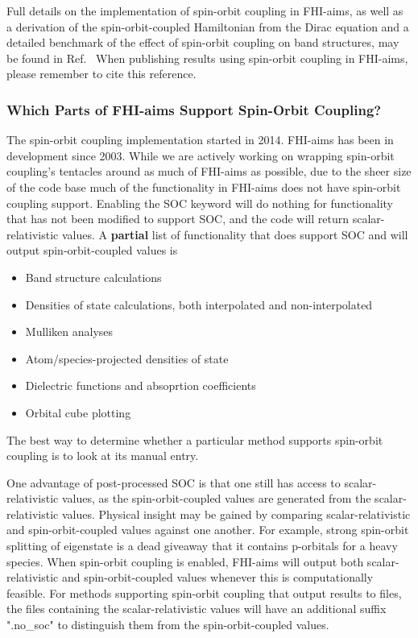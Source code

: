Full details on the implementation of spin-orbit coupling in FHI-aims, 
as well as a derivation of the spin-orbit-coupled Hamiltonian from the
Dirac equation and a detailed benchmark of the effect of spin-orbit 
coupling on band structures, may be found in Ref.~\cite{Huhn2017_SOC}  
When publishing results using spin-orbit coupling in FHI-aims, please 
remember to cite this reference.

\subsubsection{Which Parts of FHI-aims Support Spin-Orbit Coupling?}

The spin-orbit coupling implementation started in 2014.  FHI-aims has been 
in development since 2003.  While we are actively working on wrapping
spin-orbit coupling's tentacles around as much of FHI-aims as possible,
due to the sheer size of the code base much of the functionality in
FHI-aims does not have spin-orbit coupling support.  Enabling 
the SOC keyword will do nothing for functionality that has not been
modified to support SOC, and the code will return scalar-relativistic 
values.  A \textbf{partial} list of functionality that does support SOC 
and will output spin-orbit-coupled values is
\begin{itemize}
\item Band structure calculations
\item Densities of state calculations, both interpolated and 
	non-interpolated
\item Mulliken analyses
\item Atom/species-projected densities of state
\item Dielectric functions and absoprtion coefficients
\item Orbital cube plotting
\end{itemize}
The best way to determine whether a particular method supports
spin-orbit coupling is to look at its manual entry.

One advantage of post-processed SOC is that one still has access to 
scalar-relativistic values, as the spin-orbit-coupled values are 
generated from the scalar-relativistic values.  Physical insight 
may be gained by comparing scalar-relativistic and spin-orbit-coupled 
values against one another.  For example, strong spin-orbit splitting 
of eigenstate is a dead giveaway that it contains p-orbitals for a 
heavy species.  When spin-orbit coupling is enabled, FHI-aims will output 
both scalar-relativistic and spin-orbit-coupled values whenever this is 
computationally feasible.  For methods supporting spin-orbit coupling 
that output results to files, the files containing the scalar-relativistic 
values will have an additional suffix ".no\_soc" to distinguish them from 
the spin-orbit-coupled values.

